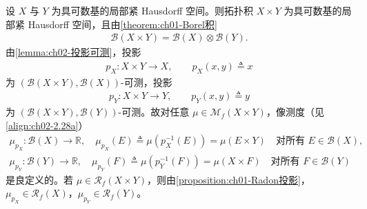 \documentclass[../../main.tex]{subfiles}%
\begin{document}
设 $X$ 与 $Y$ 为具可数基的局部紧 Hausdorff 空间。则拓扑积 $X\times Y$ 为具可数基的局部紧 Hausdorff 空间，且由\cref{theorem:ch01-Borel积}
\begin{align*}
\mathscr{B}(X\times Y)=\mathscr{B}(X)\otimes\mathscr{B}(Y).
\end{align*}
由\cref{lemma:ch02-投影可测}，投影
\begin{align*}
p_X:X\times Y\to X,\qquad p_X(x,y)\triangleq x
\end{align*}
为 $(\mathscr{B}(X\times Y),\mathscr{B}(X))$-可测，投影
\begin{align*}
p_Y:X\times Y\to Y,\qquad p_Y(x,y)\triangleq y
\end{align*}
为 $(\mathscr{B}(X\times Y),\mathscr{B}(Y))$-可测。故对任意 $\mu\in\mathcal{M}_f(X\times Y)$，像测度（见\eqref{align:ch02-2.28a}）
\begin{align}
\mu_{p_X}:\mathscr{B}(X)\to\mathbb{R},\quad
\mu_{p_X}(E)\triangleq \mu(p_X^{-1}(E))=\mu(E\times Y)
\quad\text{对所有 }E\in\mathscr{B}(X),\label{align:ch05-5.32}\\
\mu_{p_Y}:\mathscr{B}(Y)\to\mathbb{R},\quad
\mu_{p_Y}(F)\triangleq \mu(p_Y^{-1}(F))=\mu(X\times F)
\quad\text{对所有 }F\in\mathscr{B}(Y)\label{align:ch05-5.33}
\end{align}
是良定义的。若 $\mu\in\mathscr{R}_f(X\times Y)$，则由\cref{proposition:ch01-Radon投影}，$\mu_{p_X}\in\mathscr{R}_f(X)$，$\mu_{p_Y}\in\mathscr{R}_f(Y)$。
\end{document}
